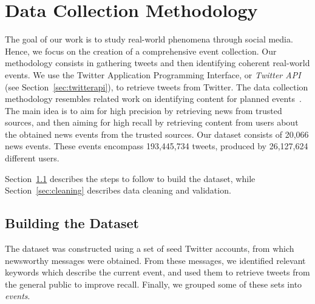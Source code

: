 \chapter{Data Collection Methodology}
\label{chapter:data}  

The goal of our work is to study real-world phenomena through social media.
%
Hence, we focus on the creation of a comprehensive event collection.
%
Our methodology consists in gathering tweets and then identifying coherent
real-world events. 
%
We use the Twitter Application Programming Interface, or {\em Twitter API} (see
Section~\ref{sec:twitterapi}), to retrieve tweets from Twitter. 
%
The data collection methodology resembles related work on identifying content
for planned events~\cite{Becker:2012}.
%
The main idea is to aim for high precision by retrieving news from trusted
sources, and then aiming for high recall by retrieving content from users about
the obtained news events from the trusted sources.
%
Our dataset consists of 20,066 news events. These events encompass 193,445,734
tweets, produced by 26,127,624 different users.


Section~\ref{sec:dataset} describes the steps to follow to build the dataset,
while Section~\ref{sec:cleaning} describes data cleaning and validation.


\section{Building the Dataset}\label{sec:dataset}

The dataset was constructed using a set of seed Twitter accounts, from which
newsworthy messages were obtained.
%
From these messages, we identified relevant keywords which describe the current
event, and used them to retrieve tweets from the general public to improve
recall.
%
Finally, we grouped some of these sets into {\em events}.




